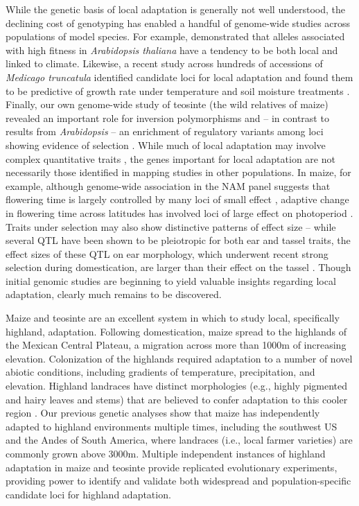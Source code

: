 While the genetic basis of local adaptation is generally not well understood, the declining cost of genotyping has enabled a handful of genome-wide studies across populations of model species.  For example, \citet{fournier2011map} demonstrated that alleles associated with high fitness in \emph{Arabidopsis thaliana} have a tendency to be both local and linked to climate.  Likewise, a recent study across hundreds of accessions of \emph{Medicago truncatula} identified candidate loci for local adaptation and found them to be predictive of growth rate under temperature and soil moisture treatments \citep{Yoder17012014}.  Finally, our own genome-wide study of teosinte (the wild relatives of maize) revealed  an important role for inversion polymorphisms and -- in contrast to results from \emph{Arabidopsis} \citep{hancock2011adaptation} -- an enrichment of regulatory variants among loci showing evidence of selection \citep{Pyhajarvi2013}. While much of local adaptation may involve complex quantitative traits \citep{le2012genetic}, the genes important for local adaptation are not necessarily those identified in mapping studies in other populations. In maize, for example, although genome-wide association in the NAM panel suggests that flowering time is largely controlled by many loci of small effect \citep{buckler2009genetic}, adaptive change in flowering time across latitudes has involved loci of large effect on photoperiod \citep{hung2012zmcct}. Traits under selection may also show distinctive patterns of effect size -- while several QTL have been shown to be pleiotropic for both ear and tassel traits, the effect sizes of these QTL on ear morphology, which underwent recent strong selection during domestication, are larger than their effect on the tassel \citep{Brown2011b}. Though initial genomic studies are beginning to yield valuable insights regarding local adaptation, clearly much remains to be discovered.  

Maize and teosinte are an excellent system in which to study local, specifically highland, adaptation.  Following domestication, maize spread to the highlands of the Mexican Central Plateau, a migration across more than 1000m of increasing elevation.  Colonization of the highlands required adaptation to a number of novel abiotic conditions, including gradients of temperature, precipitation, and elevation. Highland landraces have distinct morphologies (e.g., highly pigmented and hairy leaves and stems) that are believed to confer adaptation to this cooler region \citep{Doebley1984a}.  Our previous genetic analyses \citep{vanheerwaarden2011a} show that maize has independently adapted to highland environments multiple times, including the southwest US and the Andes of South America, where landraces (i.e., local farmer varieties) are commonly grown above 3000m. Multiple independent instances of highland adaptation in maize and teosinte provide replicated evolutionary experiments, providing power to identify and validate both widespread and population-specific candidate loci for highland adaptation.


